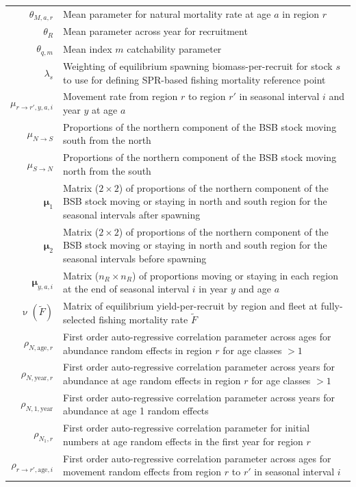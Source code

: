 \documentclass[
]{article}
\begin{document}
\begin{longtable}[c]{r p{}}
$\theta_{M,a,r}$ & Mean parameter for natural mortality rate at age $a$ in region $r$\\
$\theta_{R}$ & Mean parameter across year for recruitment\\
$\theta_{q,m}$ & Mean index $m$ catchability parameter\\
$\lambda_s$ & Weighting of equilibrium spawning biomass-per-recruit for stock $s$ to use for defining SPR-based fishing mortality reference point\\
$\mu_{r\rightarrow r',y,a,i}$ & Movement rate from region $r$ to region $r'$ in seasonal interval $i$ and year $y$ at age $a$\\
$\mu_{N\rightarrow S}$ & Proportions of the northern component of the BSB stock moving south from the north\\
$\mu_{S\rightarrow N}$ & Proportions of the northern component of the BSB stock moving north from the south\\
$\boldsymbol{\mu}_{1}$ & Matrix ($2 \times 2$) of proportions of the northern component of the BSB stock moving or staying in north and south region for the seasonal intervals after spawning\\
$\boldsymbol{\mu}_{2}$ & Matrix ($2 \times 2$) of proportions of the northern component of the BSB stock moving or staying in north and south region for the seasonal intervals before spawning\\
$\boldsymbol{\mu}_{y,a,i}$ & Matrix ($n_R \times n_R$) of proportions moving or staying in each region at the end of seasonal interval $i$ in year $y$ and age $a$ \\
$\upnu(\widetilde{F})$ & Matrix of equilibrium yield-per-recruit by region and fleet at fully-selected fishing mortality rate $\widetilde{F}$\\
$\rho_{N,\text{age},r}$ & First order auto-regressive correlation parameter across ages for abundance random effects in region $r$ for age classes $>1$\\
$\rho_{N,\text{year},r}$ & First order auto-regressive correlation parameter across years for abundance at age random effects in region $r$ for age classes $>1$\\
$\rho_{N,1,\text{year}}$ & First order auto-regressive correlation parameter across years for abundance at age 1 random effects\\
$\rho_{N_1,r}$ & First order auto-regressive correlation parameter for initial numbers at age random effects in the first year for region $r$\\
$\rho_{r \rightarrow r',\text{age},i}$ & First order auto-regressive correlation parameter across ages for movement random effects from region $r$ to $r'$ in seasonal interval $i$\\

\end{longtable}
\end{document}
